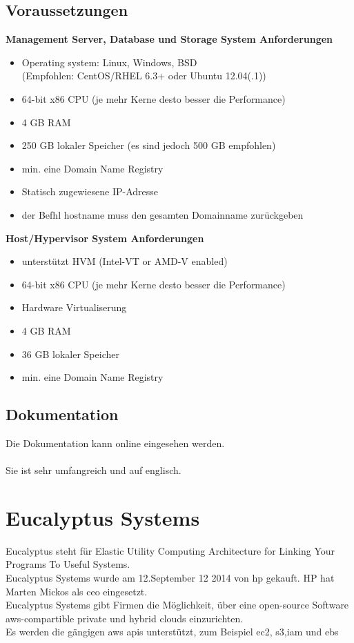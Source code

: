 \documentclass[a4paper,nochapterprefix,ngerman,12pt]{scrreprt}
\begin{document}
\section{Voraussetzungen \cite{apachereq}}
\textbf{Management Server, Database und Storage System Anforderungen}
\begin{itemize}
\item Operating system: Linux, Windows, BSD \\
(Empfohlen: CentOS/RHEL 6.3+ oder Ubuntu 12.04(.1))
\item 64-bit x86 CPU (je mehr Kerne desto besser die Performance)
\item 4 GB RAM
\item 250 GB lokaler Speicher (es sind jedoch 500 GB empfohlen)
\item min. eine Domain Name Registry
\item Statisch zugewiesene IP-Adresse
\item der Befhl hostname muss den gesamten Domainname zurückgeben\\
\end{itemize}
\textbf{Host/Hypervisor System Anforderungen}
\begin{itemize}
	\item unterstützt HVM (Intel-VT or AMD-V enabled)
	\item 64-bit x86 CPU (je mehr Kerne desto besser die Performance)
	\item Hardware Virtualiserung
	\item 4 GB RAM
	\item 36 GB lokaler Speicher
	\item min. eine Domain Name Registry\\
\end{itemize}

\section{Dokumentation}
Die Dokumentation kann online \cite{apachedoc} eingesehen werden.\\\\
Sie ist sehr umfangreich und auf englisch.

\chapter{Eucalyptus Systems} \thispagestyle{fancy}
Eucalyptus steht für Elastic Utility Computing Architecture for Linking Your Programs To Useful Systems. \cite{EucalyptusSlideShare}\\
Eucalyptus Systems wurde am 12.September 12 2014 von \gls{hp} gekauft. \cite{eucHP2}
HP hat Marten Mickos als \gls{ceo} eingesetzt. \cite{eucHP1}
\\
Eucalyptus Systems gibt Firmen die Möglichkeit, über eine open-source Software \gls{aws}-compartible private und hybrid clouds einzurichten. \\
Es werden die gängigen \gls{aws} \gls{api}s unterstützt, zum Beispiel \gls{ec2}, \gls{s3},\gls{iam} und \gls{ebs}
\cite{eucHP2}
\end{document}

